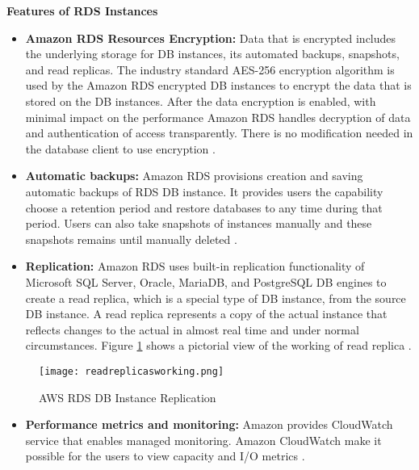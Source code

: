         {\textbf{Features of RDS Instances}
\begin{itemize}
    \item \textbf{Amazon RDS Resources Encryption:} Data that is encrypted includes the underlying storage for DB instances, its automated backups, snapshots, and read replicas.
    The industry standard AES-256 encryption algorithm is used by the Amazon RDS encrypted DB instances to encrypt the data that is stored on the DB instances.
    After the data encryption is enabled, with minimal impact on the performance Amazon RDS handles decryption of data and authentication of access transparently.
    There is no modification needed in the database client to use encryption \cite{35}.
\end{itemize}
\begin{itemize}
    \item \textbf{Automatic backups:} Amazon RDS provisions creation and saving automatic backups of RDS DB instance.
    It
    provides users the capability choose a retention period and restore databases to any time during that period.
    Users can also take snapshots of instances manually and these snapshots remains until manually deleted \cite{71}.
\end{itemize}
\begin{itemize}
    \item \textbf{Replication:} Amazon RDS uses built-in
    replication functionality of Microsoft SQL Server, Oracle, MariaDB, and PostgreSQL DB engines to create a read replica, which is a special type of DB instance, from the source DB instance.
    A read replica represents a copy of the actual instance that reflects changes to the actual in almost real time and under normal circumstances.
    Figure \ref{fig:readreplicasworking} shows a pictorial view of the working of read replica \cite{35}.
\end{itemize}
\begin{figure}
    \centering
    \texttt{[image: readreplicasworking.png]}
    \caption{AWS RDS DB Instance Replication}
    \label{fig:readreplicasworking}
\end{figure}
\begin{itemize}
    \item \textbf{Performance metrics and monitoring:} Amazon provides CloudWatch service that enables managed
    monitoring.
    Amazon CloudWatch make it possible for the users to view capacity and I/O metrics \cite{35}.
\end{itemize}



}

